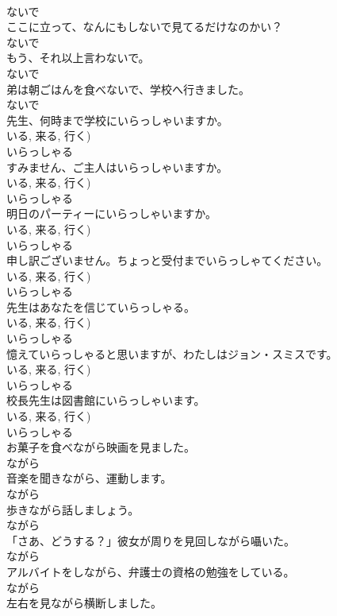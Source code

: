 \documentclass[8pt]{extreport}
\begin{document}
\begin{CJK}{UTF8}{min}
\\	ないで
\\	ここに立って、なんにもしないで見てるだけなのかい？	
\\	ないで
\\	もう、それ以上言わないで。	
\\	ないで
\\	弟は朝ごはんを食べないで、学校へ行きました。	
\\	ないで
\\	先生、何時まで学校にいらっしゃいますか。	
\\	いる, 来る, 行く)	
\\	いらっしゃる
\\	すみません、ご主人はいらっしゃいますか。	
\\	いる, 来る, 行く)	
\\	いらっしゃる
\\	明日のパーティーにいらっしゃいますか。	
\\	いる, 来る, 行く)	
\\	いらっしゃる
\\	申し訳ございません。ちょっと受付までいらっしゃてください。	
\\	いる, 来る, 行く)	
\\	いらっしゃる
\\	先生はあなたを信じていらっしゃる。	
\\	いる, 来る, 行く)	
\\	いらっしゃる
\\	憶えていらっしゃると思いますが、わたしはジョン・スミスです。	
\\	いる, 来る, 行く)	
\\	いらっしゃる
\\	校長先生は図書館にいらっしゃいます。	
\\	いる, 来る, 行く)	
\\	いらっしゃる
\\	お菓子を食べながら映画を見ました。	
\\	ながら
\\	音楽を聞きながら、運動します。	
\\	ながら
\\	歩きながら話しましょう。	
\\	ながら
\\	「さあ、どうする？」彼女が周りを見回しながら囁いた。	
\\	ながら
\\	アルバイトをしながら、弁護士の資格の勉強をしている。	
\\	ながら
\\	左右を見ながら横断しました。	

\end{CJK}
\end{document}
